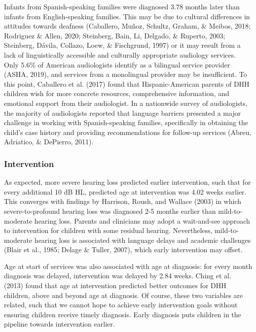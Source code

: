 \documentclass[english,man]{apa6}
\begin{document}
Infants from Spanish-speaking families were diagnosed 3.78 months later than infants from English-speaking families. This may be due to cultural differences in attitudes towards deafness (Caballero, Muñoz, Schultz, Graham, \& Meibos, 2018; Rodriguez \& Allen, 2020; Steinberg, Bain, Li, Delgado, \& Ruperto, 2003; Steinberg, Dávila, Collazo, Loew, \& Fischgrund, 1997) or it may result from a lack of linguistically accessible and culturally appropriate audiology services. Only 5.6\% of American audiologists identify as a bilingual service provider (ASHA, 2019), and services from a monolingual provider may be insufficient. To this point, Caballero et al. (2017) found that Hispanic-American parents of DHH children wish for more concrete resources, comprehensive information, and emotional support from their audiologist. In a nationwide survey of audiologists, the majority of audiologists reported that language barriers presented a major challenge in working with Spanish-speaking families, specifically in obtaining the child's case history and providing recommendations for follow-up services (Abreu, Adriatico, \& DePierro, 2011).

\hypertarget{intervention}{%
\subsubsection{Intervention}\label{intervention}}

As expected, more severe hearing loss predicted earlier intervention, such that for every additional 10 dB HL, predicted age at intervention was 4.02 weeks earlier. This converges with findings by Harrison, Roush, and Wallace (2003) in which severe-to-profound hearing loss was diagnosed 2-5 months earlier than mild-to-moderate hearing loss. Parents and clinicians may adopt a wait-and-see approach to intervention for children with some residual hearing. Nevertheless, mild-to-moderate hearing loss is associated with language delays and academic challenges (Blair et al., 1985; Delage \& Tuller, 2007), which early intervention may offset.

Age at start of services was also associated with age at diagnosis: for every month diagnosis was delayed, intervention was delayed by 2.84 weeks. Ching et al. (2013) found that age at intervention predicted better outcomes for DHH children, above and beyond age at diagnosis. Of course, these two variables are related, such that we cannot hope to achieve early intervention goals without ensuring children receive timely diagnosis. Early diagnosis puts children in the pipeline towards intervention earlier.
\end{document}
